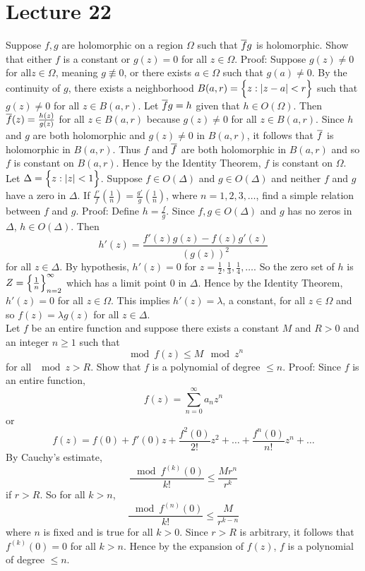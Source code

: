 \documentclass[12pt]{article}
\begin{document}
\section{Lecture 22} 
Suppose $f,g$ are holomorphic on a region $\Omega$ such that $\overline{f}g$ is holomorphic. Show that either $f$ is a constant or $g(z) = 0$ for all $z \in \Omega$. Proof: Suppose $g(z) \neq 0$ for all$ z \in \Omega$, meaning $g \not\equiv 0$, or there exists $a \in \Omega$ such that $g(a) \neq 0$. By the continuity of $g$, there exists a neighborhood $B(a,r) = \Big\{ z: \abs{z-a} <r \Big\}$ such that $g(z) \neq 0$ for all $z \in B(a,r)$. Let $\overline{f}g=h$ given that $h \in O(\Omega)$. Then $\overline{f}(z) = \frac{h(z)}{g(z)}$ for all $z \in B(a,r)$ because $g(z) \neq 0$ for all $z \in B(a,r)$. Since $h$ and $g$ are both holomorphic and $g(z) \neq 0$ in $B(a,r)$, it follows that $\overline{f}$ is holomorphic in $B(a,r)$. Thus $f$ and $\overline{f}$ are both holomorphic in $B(a,r)$ and so $f$ is constant on $B(a,r)$. Hence by the Identity Theorem, $f$ is constant on $\Omega$. \\
Let $\Delta = \Big\{ z: \abs{z} < 1 \Big\}$. Suppose $f \in O(\Delta)$ and $g \in O(\Delta)$ and neither $f$ and $g$ have a zero in $\Delta$. If $ \frac{f'}{f} (\frac{1}{n}) = \frac{g'}{g}(\frac{1}{n})$, where $n = 1,2,3,\dots$, find a simple relation between $f$ and $g$. Proof: Define $h = \frac{f}{g}$. Since $f,g\in O(\Delta)$ and $g$ has no zeros in $\Delta$, $h \in O(\Delta)$. Then $$ h'(z) = \frac{f'(z)g(z) - f(z)g'(z)}{(g(z))^2}$$ for all $z \in \Delta$. By hypothesis, $h'(z) = 0$ for $z = \frac{1}{2}, \frac{1}{3}, \frac{1}{4}, \dots$. So the zero set of $h$ is $Z = \Big\{ \frac{1}{n} \Big\}_{n=2}^\infty$ which has a limit point $0$ in $\Delta$. Hence by the Identity Theorem, $h'(z) = 0$ for all $z \in \Omega$. This implies $h'(z) = \lambda$, a constant, for all $z \in \Omega$ and so $f(z) = \lambda g(z)$ for all $z \in \Delta$. \\ 
Let $f$ be an entire function and suppose there exists a constant $M$ and $R > 0$ and an integer $n \geq 1$ such that $$\mod{f(z)} \leq M\mod{z}^n$$ for all $\mod{z} > R$. Show that $f$ is a polynomial of degree $\leq n$. Proof: Since $f$ is an entire function, $$f(z) = \sum_{n=0}^\infty a_nz^n$$ or $$ f(z) = f(0) + f'(0)z + \frac{f^2(0)}{2!}z^2 + \dots + \frac{f^n(0)}{n!}z^n + \dots $$ 
By Cauchy's estimate, $$ \frac{\mod{f^{(k)}(0)}}{k!} \leq \frac{Mr^n}{r^k} $$ if $r > R$. So for all $ k > n$, $$ \frac{\mod{f^{(n)}(0)}}{k!} \leq \frac{M}{r^{k-n}} $$ where $n$ is fixed and is true for all $k > 0$. Since $r > R$ is arbitrary, it follows that $f^{(k)}(0) = 0$ for all $k>n$. Hence by the expansion of $f(z)$, $f$ is a polynomial of degree $\leq n$. \\
\end{document}
